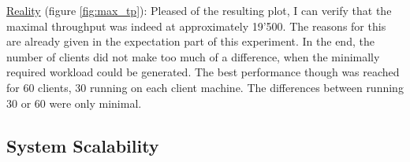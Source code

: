 \documentclass[11pt]{article}
\begin{document}
\newline\underline{Reality} (figure \ref{fig:max_tp}): Pleased of the resulting plot, I can verify that the maximal throughput was indeed at approximately 19'500. The reasons for this are already given in the expectation part of this experiment. In the end, the number of clients did not make too much of a difference, when the minimally required workload could be generated. The best performance though was reached for 60 clients, 30 running on each client machine. The differences between running 30 or 60 were only minimal.

\subsection{System Scalability}\label{sec:system-scalability}
\end{document}
